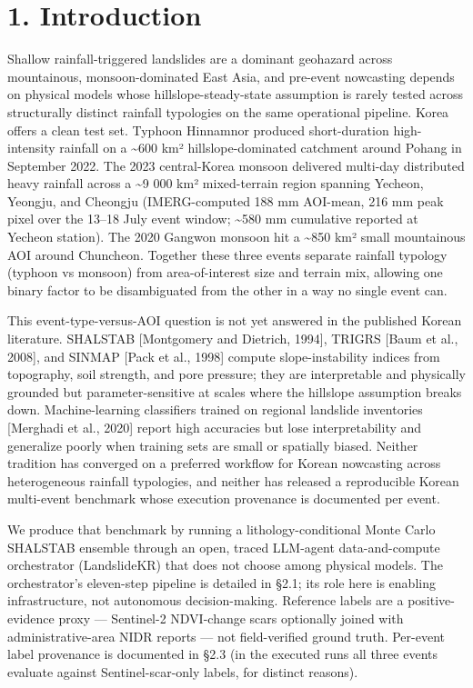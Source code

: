 \documentclass[11pt,a4paper]{article}
\begin{document}
\section{1. Introduction}\label{introduction}

Shallow rainfall-triggered landslides are a dominant geohazard across mountainous, monsoon-dominated East Asia, and pre-event nowcasting depends on physical models whose hillslope-steady-state assumption is rarely tested across structurally distinct rainfall typologies on the same operational pipeline. Korea offers a clean test set. Typhoon Hinnamnor produced short-duration high-intensity rainfall on a \textasciitilde600 km² hillslope-dominated catchment around Pohang in September 2022. The 2023 central-Korea monsoon delivered multi-day distributed heavy rainfall across a \textasciitilde9 000 km² mixed-terrain region spanning Yecheon, Yeongju, and Cheongju (IMERG-computed 188 mm AOI-mean, 216 mm peak pixel over the 13--18 July event window; \textasciitilde580 mm cumulative reported at Yecheon station). The 2020 Gangwon monsoon hit a \textasciitilde850 km² small mountainous AOI around Chuncheon. Together these three events separate rainfall typology (typhoon vs monsoon) from area-of-interest size and terrain mix, allowing one binary factor to be disambiguated from the other in a way no single event can.

This event-type-versus-AOI question is not yet answered in the published Korean literature. SHALSTAB {[}Montgomery and Dietrich, 1994{]}, TRIGRS {[}Baum et al., 2008{]}, and SINMAP {[}Pack et al., 1998{]} compute slope-instability indices from topography, soil strength, and pore pressure; they are interpretable and physically grounded but parameter-sensitive at scales where the hillslope assumption breaks down. Machine-learning classifiers trained on regional landslide inventories {[}Merghadi et al., 2020{]} report high accuracies but lose interpretability and generalize poorly when training sets are small or spatially biased. Neither tradition has converged on a preferred workflow for Korean nowcasting across heterogeneous rainfall typologies, and neither has released a reproducible Korean multi-event benchmark whose execution provenance is documented per event.

We produce that benchmark by running a lithology-conditional Monte Carlo SHALSTAB ensemble through an open, traced LLM-agent data-and-compute orchestrator (LandslideKR) that does not choose among physical models. The orchestrator's eleven-step pipeline is detailed in §2.1; its role here is enabling infrastructure, not autonomous decision-making. Reference labels are a positive-evidence proxy --- Sentinel-2 NDVI-change scars optionally joined with administrative-area NIDR reports --- not field-verified ground truth. Per-event label provenance is documented in §2.3 (in the executed runs all three events evaluate against Sentinel-scar-only labels, for distinct reasons).
\end{document}
